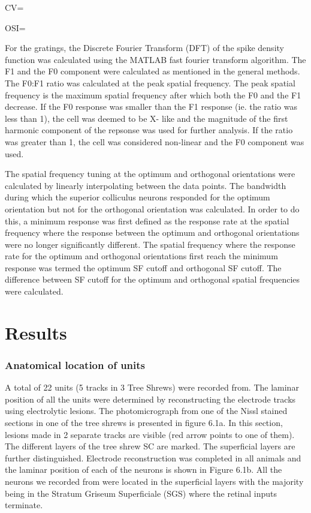 	 CV=
	 
	 OSI=
	
	For the gratings, the Discrete Fourier Transform (DFT) of the spike density function was calculated using the MATLAB fast fourier transform algorithm. The F1 and the F0 component were calculated as mentioned in the general methods. The F0:F1 ratio was calculated at the peak spatial frequency. The peak spatial frequency is the maximum spatial frequency after which both the F0 and the F1 decrease. If the F0 response was smaller than the F1 response (ie. the ratio was less than 1), the cell was deemed to be X- like and the magnitude of the first harmonic component of the repsonse was used for further analysis. If the ratio was greater than 1, the cell was considered non-linear and the F0 component was used.
	
	The spatial frequency tuning at the optimum and orthogonal orientations were calculated by linearly interpolating between the data points. The bandwidth during which the superior colliculus neurons responded for the optimum orientation but not for the orthogonal orientation was calculated. In order to do this,  a minimum response was first defined as the response rate at the spatial frequency where the response between the optimum and orthogonal orientations were no longer significantly different. The spatial frequency where the response rate for the optimum and orthogonal orientations first reach the minimum response was termed the optimum SF cutoff and orthogonal SF cutoff. The difference between SF cutoff for the optimum and orthogonal spatial frequencies were calculated.
	
	\section{Results}
	\subsubsection{Anatomical location of units}
	
		A total of 22 units (5 tracks in  3 Tree Shrews) were recorded from. The laminar position of all the units were determined by reconstructing the electrode tracks using electrolytic lesions. The photomicrograph from one of the Nissl stained sections in one of the tree shrews is presented in figure 6.1a. In this section, lesions made in 2 separate tracks are visible (red arrow points to one of them). The different layers of the tree shrew SC are marked. The superficial layers are further distinguished. Electrode reconstruction was completed in all animals and the laminar position of each of the neurons is shown in Figure 6.1b. All the neurons we recorded from were located in the superficial layers with the majority being in the Stratum Griseum Superficiale (SGS) where the retinal inputs terminate.
		
